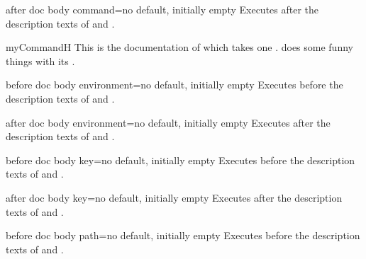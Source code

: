 \begin{docTcbKey}[][doc new=2015-10-09]{after doc body command}{=}{no default, initially empty}
  Executes  after the description texts
  of  and .
\begin{dispExample}

\begin{docCommand*}{myCommandH}{}
  This is the documentation of  which takes one .
   does some funny things with its .
\end{docCommand*}
\end{dispExample}
\end{docTcbKey}


\begin{docTcbKey}[][doc new=2015-10-09]{before doc body environment}{=}{no default, initially empty}
  Executes  before the description texts
  of  and .
\end{docTcbKey}

\begin{docTcbKey}[][doc new=2015-10-09]{after doc body environment}{=}{no default, initially empty}
  Executes  after the description texts
  of  and .
\end{docTcbKey}


\begin{docTcbKey}[][doc new=2015-10-09]{before doc body key}{=}{no default, initially empty}
  Executes  before the description texts
  of  and .
\end{docTcbKey}

\begin{docTcbKey}[][doc new=2015-10-09]{after doc body key}{=}{no default, initially empty}
  Executes  after the description texts
  of  and .
\end{docTcbKey}

\clearpage

\begin{docTcbKey}[][doc new=2019-09-18]{before doc body path}{=}{no default, initially empty}
  Executes  before the description texts
  of  and .
\end{docTcbKey}

